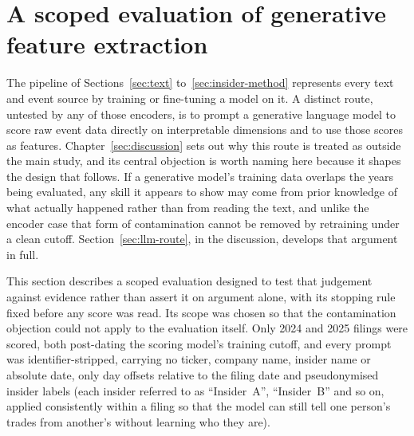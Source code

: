 \documentclass[logo,msc,ai]{infthesis}        %
\begin{document}
\section{A scoped evaluation of generative feature extraction}
\label{sec:llm-pilot-method}
The pipeline of Sections~\ref{sec:text} to~\ref{sec:insider-method} represents every text and event source by training or fine-tuning a model on it. A distinct route, untested by any of those encoders, is to prompt a generative language model to score raw event data directly on interpretable dimensions and to use those scores as features. Chapter~\ref{sec:discussion} sets out why this route is treated as outside the main study, and its central objection is worth naming here because it shapes the design that follows. If a generative model's training data overlaps the years being evaluated, any skill it appears to show may come from prior knowledge of what actually happened rather than from reading the text, and unlike the encoder case that form of contamination cannot be removed by retraining under a clean cutoff. Section~\ref{sec:llm-route}, in the discussion, develops that argument in full.

This section describes a scoped evaluation designed to test that judgement against evidence rather than assert it on argument alone, with its stopping rule fixed before any score was read. Its scope was chosen so that the contamination objection could not apply to the evaluation itself. Only 2024 and 2025 filings were scored, both post-dating the scoring model's training cutoff, and every prompt was identifier-stripped, carrying no ticker, company name, insider name or absolute date, only day offsets relative to the filing date and pseudonymised insider labels (each insider referred to as ``Insider~A'', ``Insider~B'' and so on, applied consistently within a filing so that the model can still tell one person's trades from another's without learning who they are).
\end{document}
